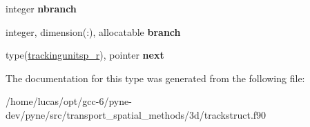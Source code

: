 \begin{DoxyCompactItemize}
\item 
integer {\bfseries nbranch}\hypertarget{structtracking__data__structures_1_1trackingunitsp__r_a5378c801096551d6d507eb04dd011a6c}{}\label{structtracking__data__structures_1_1trackingunitsp__r_a5378c801096551d6d507eb04dd011a6c}

\item 
integer, dimension(\+:), allocatable {\bfseries branch}\hypertarget{structtracking__data__structures_1_1trackingunitsp__r_a190f4625d2f13828b2f02ca184121c79}{}\label{structtracking__data__structures_1_1trackingunitsp__r_a190f4625d2f13828b2f02ca184121c79}

\item 
type(\hyperlink{structtracking__data__structures_1_1trackingunitsp__r}{trackingunitsp\+\_\+r}), pointer {\bfseries next}\hypertarget{structtracking__data__structures_1_1trackingunitsp__r_a24d8fb2d7521637baa6381200f4fd753}{}\label{structtracking__data__structures_1_1trackingunitsp__r_a24d8fb2d7521637baa6381200f4fd753}

\end{DoxyCompactItemize}


The documentation for this type was generated from the following file\+:\begin{DoxyCompactItemize}
\item 
/home/lucas/opt/gcc-\/6/pyne-\/dev/pyne/src/transport\+\_\+spatial\+\_\+methods/3d/trackstruct.\+f90\end{DoxyCompactItemize}
